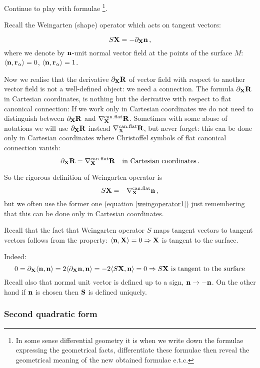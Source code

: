 \documentclass[12pt]{article}
\theoremstyle{theorem}
\numberwithin{equation}{section}
\begin{document}
{ Continue to play with formulae \footnote{In some sense differential geometry it is when we write down
 the formulae expressing the geometrical facts, differentiate these formulae then reveal the geometrical meaning
  of the new obtained formulae e.t.c.}.


Recall the Weingarten (shape) operator which acts on tangent vectors:

  \begin{equation}\label{weingoperator1}
    S\X=-\p_\X \n\,,
  \end{equation}
 where we denote by $\n$-unit normal vector field at the points of the surface $M$: $\langle\n,\r_\a\rangle=0$,
 $\langle\n,\r_\a\rangle=1$.

\m

 Now we realise that the derivative $\p_\X \R$ of vector field with respect to another vector field
 is not a well-defined object: we need a connection.
 The formula $\p_\X \R$ in Cartesian coordinates,
 is nothing but the derivative with respect to flat canonical connection:
 If we work only in Cartesian coordinates we do not need to distinguish between
 $\p_\X \R$ and $\nabla^{\rm can.flat}_\X\R $. Sometimes with some abuse of notations we will use
 $\p_\X \R$ instead $\nabla^{\rm can.flat}_\X\R $, but never forget: this can be done only in Cartesian coordinates
 where Christoffel symbols of flat canonical connection vanish:
              $$
      \p_\X \R=\nabla^{\rm can.flat}_\X\R  \quad \hbox{in Cartesian coordinates}\,.
         $$

 So  the rigorous definition of Weingarten operator is
\begin{equation}\label{weingoperator2}
    S\X=-\nabla^{\rm can.flat}_\X \n\,,
  \end{equation}
  but we often use the former one (equation \eqref{weingoperator1})
   just remembering that this can be done only in Cartesian coordinates.

  Recall that the fact that Weingarten operator $S$ maps tangent vectors to tangent vectors follows from the property:
  $\langle\n,\X\rangle=0\Rightarrow \X$ is tangent to the surface.

  Indeed:
     $$
 0= \p_\X\langle\n,\n\rangle=2\langle\p_\X\n,\n\rangle=-2\langle S\X,\n\rangle=0\Rightarrow S\X\,\,
 \hbox {is tangent to the surface}
     $$
     \m
Recall also that normal unit vector is defined up to a sign, $\n\to -\n$. On the other hand if $\n$
is chosen then $\S$ is defined uniquely.


\subsubsection {Second quadratic form}

}
\end{document}

